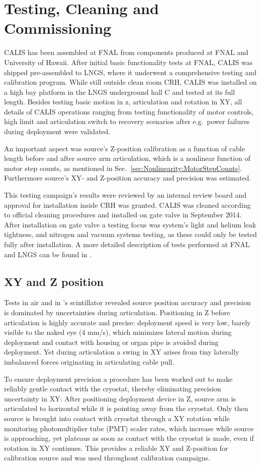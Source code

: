 \section{Testing, Cleaning and Commissioning} \label{sec:Testing}\label{sec:Commissioning}
CALIS has been assembled at FNAL from components produced at FNAL and University of Hawaii. After initial basic functionality tests at FNAL, CALIS was shipped pre-assembled to LNGS, where it underwent a comprehensive testing and calibration program. While still outside clean room CRH, CALIS was installed on a high bay platform in the LNGS underground hall C and tested at its full length. Besides testing basic motion in z, articulation and rotation in XY, all details of CALIS operations ranging from testing functionality of motor controls, high limit and articulation switch to recovery scenarios after e.g.~power failures during deployment were validated.

An important aspect was source's Z-position calibration as a function of cable length before and after source arm articulation, which is a nonlinear function of motor step counts, as mentioned in Sec.~\ref{sec:Nonlinearity:MotorStepCounts}. Furthermore source's XY- and Z-position accuracy and precision was estimated.

This testing campaign's results were reviewed by an internal review board and approval for installation inside CRH was granted. CALIS was cleaned according to official cleaning procedures and installed on gate valve in September 2014.
After installation on gate valve a testing focus was system's light and helium leak tightness, and nitrogen and vacuum systems testing, as these could only be tested fully after installation. A more detailed description of tests performed at FNAL and LNGS can be found in \cite{thesis:Hackett, thesis:Edkins}.

\subsection*{XY and Z position}
Tests in air and in \lsv's scintillator revealed source position accuracy and precision is dominated by uncertainties during articulation. Positioning in Z before articulation is highly accurate and precise: deployment speed is very low, barely visible to the naked eye (4 mm/s), which minimizes lateral motion during deployment and contact with housing or organ pipe is avoided during deployment. Yet during articulation a swing in XY arises from tiny laterally imbalanced forces originating in articulating cable pull. 

To ensure deployment precision a procedure has been worked out to make reliably gentle contact with the cryostat, thereby eliminating precision uncertainty in XY: After positioning deployment device in Z, source arm is articulated to horizontal while it is pointing away from the cryostat. Only then source is brought into contact with cryostat through a XY rotation while monitoring photomultiplier tube (PMT) scaler rates, which increase while source is approaching, yet plateaus as soon as contact with the cryostat is made, even if rotation in XY continues. This provides a reliable XY and Z-position for calibration source and was used throughout calibration campaigns.